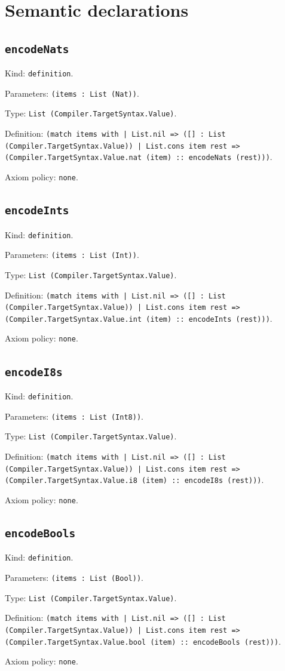 \documentclass[11pt]{article}
\begin{document}
\section*{Semantic declarations}
\subsection*{\texttt{encodeNats}}
\noindent Kind: \texttt{definition}.\par
\noindent Parameters: \texttt{(items : List (Nat))}.\par
\noindent Type: \texttt{List (Compiler.TargetSyntax.Value)}.\par
\noindent Definition: \texttt{(match items with | List.nil => ([] : List (Compiler.TargetSyntax.Value)) | List.cons item rest => (Compiler.TargetSyntax.Value.nat (item) :: encodeNats (rest)))}.\par
\noindent Axiom policy: \texttt{none}.\par
\subsection*{\texttt{encodeInts}}
\noindent Kind: \texttt{definition}.\par
\noindent Parameters: \texttt{(items : List (Int))}.\par
\noindent Type: \texttt{List (Compiler.TargetSyntax.Value)}.\par
\noindent Definition: \texttt{(match items with | List.nil => ([] : List (Compiler.TargetSyntax.Value)) | List.cons item rest => (Compiler.TargetSyntax.Value.int (item) :: encodeInts (rest)))}.\par
\noindent Axiom policy: \texttt{none}.\par
\subsection*{\texttt{encodeI8s}}
\noindent Kind: \texttt{definition}.\par
\noindent Parameters: \texttt{(items : List (Int8))}.\par
\noindent Type: \texttt{List (Compiler.TargetSyntax.Value)}.\par
\noindent Definition: \texttt{(match items with | List.nil => ([] : List (Compiler.TargetSyntax.Value)) | List.cons item rest => (Compiler.TargetSyntax.Value.i8 (item) :: encodeI8s (rest)))}.\par
\noindent Axiom policy: \texttt{none}.\par
\subsection*{\texttt{encodeBools}}
\noindent Kind: \texttt{definition}.\par
\noindent Parameters: \texttt{(items : List (Bool))}.\par
\noindent Type: \texttt{List (Compiler.TargetSyntax.Value)}.\par
\noindent Definition: \texttt{(match items with | List.nil => ([] : List (Compiler.TargetSyntax.Value)) | List.cons item rest => (Compiler.TargetSyntax.Value.bool (item) :: encodeBools (rest)))}.\par
\noindent Axiom policy: \texttt{none}.\par
\end{document}
